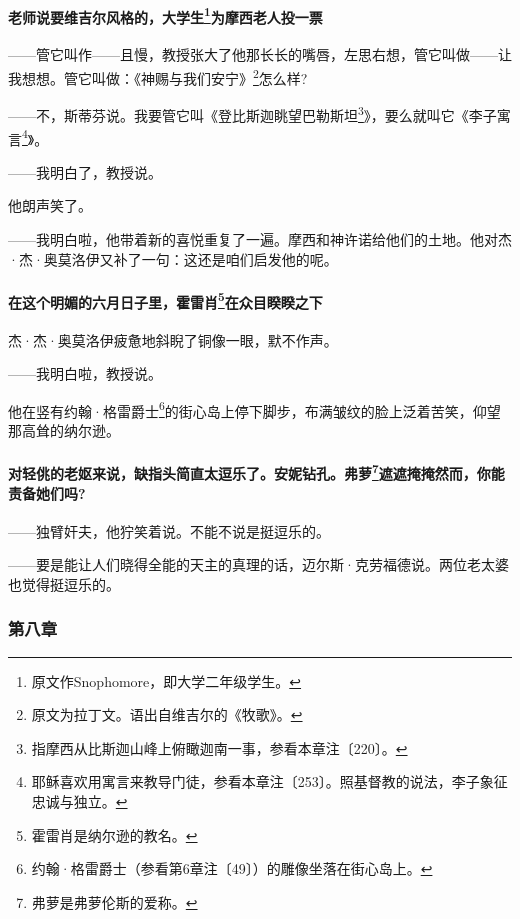 \paragraph*{老师说要维吉尔风格的，大学生\footnote{原文作Snophomore，即大学二年级学生。}为摩西老人投一票}
\par ——管它叫作——且慢，教授张大了他那长长的嘴唇，左思右想，管它叫做——让我想想。管它叫做：《神赐与我们安宁》\footnote{原文为拉丁文。语出自维吉尔的《牧歌》。}怎么样?
\par ——不，斯蒂芬说。我要管它叫《登比斯迦眺望巴勒斯坦\footnote{指摩西从比斯迦山峰上俯瞰迦南一事，参看本章注〔220〕。}》，要么就叫它《李子寓言\footnote{耶稣喜欢用寓言来教导门徒，参看本章注〔253〕。照基督教的说法，李子象征忠诚与独立。}》。
\par ——我明白了，教授说。
\par 他朗声笑了。
\par ——我明白啦，他带着新的喜悦重复了一遍。摩西和神许诺给他们的土地。他对杰·杰·奥莫洛伊又补了一句：这还是咱们启发他的呢。
\paragraph*{在这个明媚的六月日子里，霍雷肖\footnote{霍雷肖是纳尔逊的教名。}在众目睽睽之下}
\par 杰·杰·奥莫洛伊疲惫地斜睨了铜像一眼，默不作声。
\par ——我明白啦，教授说。
\par 他在竖有约翰·格雷爵士\footnote{约翰·格雷爵士（参看第6章注〔49〕）的雕像坐落在街心岛上。}的街心岛上停下脚步，布满皱纹的脸上泛着苦笑，仰望那高耸的纳尔逊。
\paragraph*{对轻佻的老妪来说，缺指头简直太逗乐了。安妮钻孔。弗萝\footnote{弗萝是弗萝伦斯的爱称。}遮遮掩掩然而，你能责备她们吗?}
\par ——独臂奸夫，他狞笑着说。不能不说是挺逗乐的。
\par ——要是能让人们晓得全能的天主的真理的话，迈尔斯·克劳福德说。两位老太婆也觉得挺逗乐的。








\subsubsection*{第八章}

